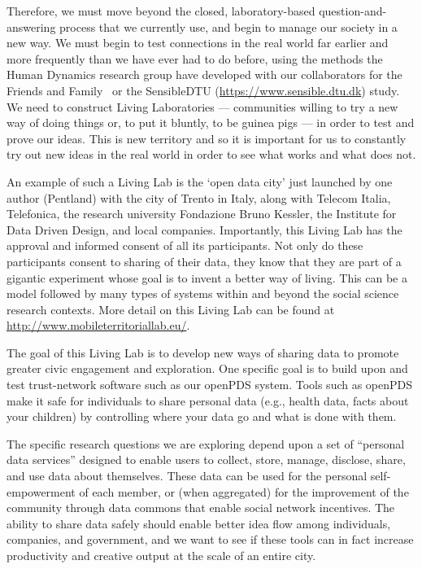 Therefore, we must move beyond the closed, laboratory-based question-and-answering process that we currently use, and begin to manage our society in a new way.
We must begin to test connections in the real world far earlier and more frequently than we have ever had to do before, using the methods the Human Dynamics research group have developed with our collaborators for the Friends and Family~\cite{aharony2011social} or the SensibleDTU (\url{https://www.sensible.dtu.dk}) study. 
We need to construct Living Laboratories --- communities willing to try a new way of doing things or, to put it bluntly, to be guinea pigs --- in order to test and prove our ideas.
This is new territory and so it is important for us to constantly try out new ideas in the real world in order to see what works and what does not.

An example of such a Living Lab is the `open data city' just launched by one author (Pentland) with the city of Trento in Italy, along with Telecom Italia, Telefonica, the research university Fondazione Bruno Kessler, the Institute for Data Driven Design, and local companies.
Importantly, this Living Lab has the approval and informed consent of all its participants.  Not only do these participants consent to sharing of their data, they know that they are part of a gigantic experiment whose goal is to invent a better way of living.  This can be a model followed by many types of systems within and beyond the social science research contexts.  
More detail on this Living Lab can be found at \url{http://www.mobileterritoriallab.eu/}.

The goal of this Living Lab is to develop new ways of sharing data to promote greater civic engagement and exploration.
One specific goal is to build upon and test trust-network software such as our openPDS system.
Tools such as openPDS make it safe for individuals to share personal data (e.g., health data, facts about your children) by controlling where your data go and what is done with them.

The specific research questions we are exploring depend upon a set of ``personal data services'' designed to enable users to collect, store, manage, disclose, share, and use data about themselves.
These data can be used for the personal self-empowerment of each member, or (when aggregated) for the improvement of the community through data commons that enable social network incentives.
The ability to share data safely should enable better idea flow among individuals, companies, and government, and we want to see if these tools can in fact increase productivity and creative output at the scale of an entire city.

